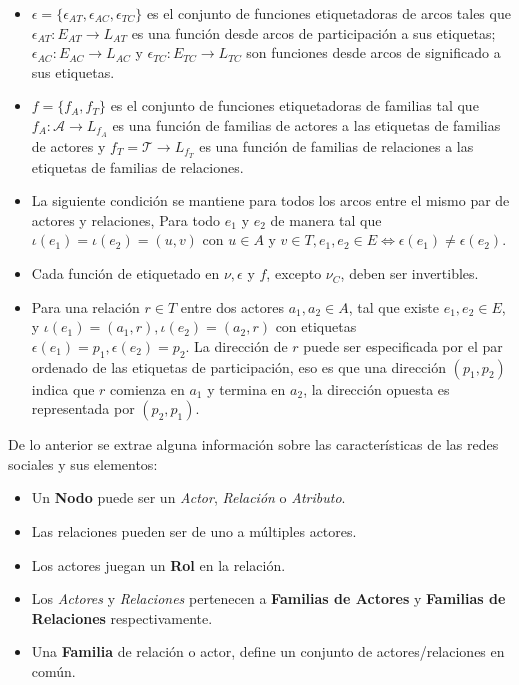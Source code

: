 \begin{defn}
\begin{itemize}
    \item $\epsilon = \{ \epsilon_{AT} , \epsilon_{AC} , \epsilon_{TC} \}$ es el conjunto de funciones etiquetadoras de arcos tales que $ \epsilon_{AT} : E_{AT} \longrightarrow L_{AT}$ es una función desde arcos de participación a sus etiquetas; $ \epsilon_{AC} : E_{AC} \longrightarrow L_{AC}$ y $ \epsilon_{TC} : E_{TC} \longrightarrow L_{TC}$ son funciones desde arcos de significado a sus etiquetas.
    \item $f = \{f_A, f_T\}$ es el conjunto de funciones etiquetadoras de familias tal que $f_A : \mathcal{A} \longrightarrow L_{f_A}$ es una función de familias de actores a las etiquetas de familias de actores y $f_T = \mathcal{T} \longrightarrow L_{f_T}$ es una función de familias de relaciones a las etiquetas de familias de relaciones.
    \item La siguiente condición se mantiene para todos los arcos entre el mismo par de actores y relaciones, Para todo $e_1$ y $e_2$ de manera tal que $\iota(e_1) = \iota(e_2) = (u,v)$ con $u \in A$ y $v \in T, e_1, e_2 \in E \Leftrightarrow \epsilon(e_1) \neq \epsilon(e_2)$.
    \item Cada función de etiquetado en $\nu, \epsilon$ y $f$, excepto $\nu_C$, deben ser invertibles.
    \item Para una relación $r \in T$ entre dos actores $a_1, a_2 \in A$, tal que existe $e_1, e_2 \in E$, y $\iota(e_1) = (a_1, r), \iota(e_2) = (a_2, r)$ con etiquetas $\epsilon(e_1) = p_1, \epsilon(e_2) = p_2$. La dirección de $r$ puede ser especificada por el par ordenado de las etiquetas de participación, eso es que una dirección $(p_1, p_2)$ indica que $r$ comienza en $a_1$ y termina en $a_2$, la dirección opuesta es representada por $(p_2, p_1)$.
  \end{itemize}
\end{defn}

De lo anterior se extrae alguna información sobre las características de las redes sociales y sus elementos:

\begin{itemize}
  \item Un \textbf{Nodo} puede ser un \emph{Actor}, \emph{Relación} o \emph{Atributo}.
  \item Las relaciones pueden ser de uno a múltiples actores.
  \item Los actores juegan un \textbf{Rol} en la relación.
  \item Los \emph{Actores} y \emph{Relaciones} pertenecen a \textbf{Familias de Actores} y \textbf{Familias de Relaciones} respectivamente.
  \item Una \textbf{Familia} de relación o actor, define un conjunto de actores/relaciones en común.
\end{itemize}


% 
% 
% 
% 
